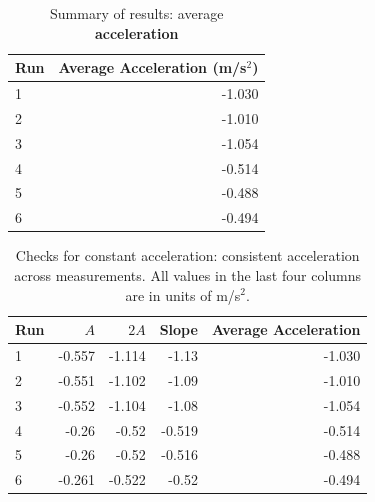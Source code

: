 \begin{table}[ht]
    \centering
    \begin{tabular}{|l|r|}
        \hline
        \textbf{Run} & \textbf{Average Acceleration} (m/s$^{2}$) \\
        \hline
        1 & -1.030 \\
        2 & -1.010 \\
        3 & -1.054 \\
        \hline
        4 & -0.514 \\
        5 & -0.488 \\
        6 & -0.494 \\
        \hline
    \end{tabular}
    \caption{Summary of results: average \textbf{acceleration}}
    \label{table:02.fit.a}
\end{table}
\begin{table}[ht]
    \centering
    \begin{tabular}{|l|r|r|r|r|}
        \hline
        \textbf{Run} & $A$ & $2A$ & \textbf{Slope} & \textbf{Average Acceleration} \\
        \hline
        1 & -0.557 & -1.114 & -1.13 & -1.030 \\
        2 & -0.551 & -1.102 & -1.09 & -1.010 \\
        3 & -0.552 & -1.104 & -1.08 & -1.054 \\
        \hline
        4 & -0.26 & -0.52 & -0.519 & -0.514 \\
        5 & -0.26 & -0.52 & -0.516 & -0.488 \\
        6 & -0.261 & -0.522 & -0.52 & -0.494 \\
        \hline
    \end{tabular}
    \caption{Checks for constant acceleration: consistent acceleration across measurements. All values in the last four columns are in units of m/s$^{2}$.}
    \label{table:02.check.a}
\end{table}
